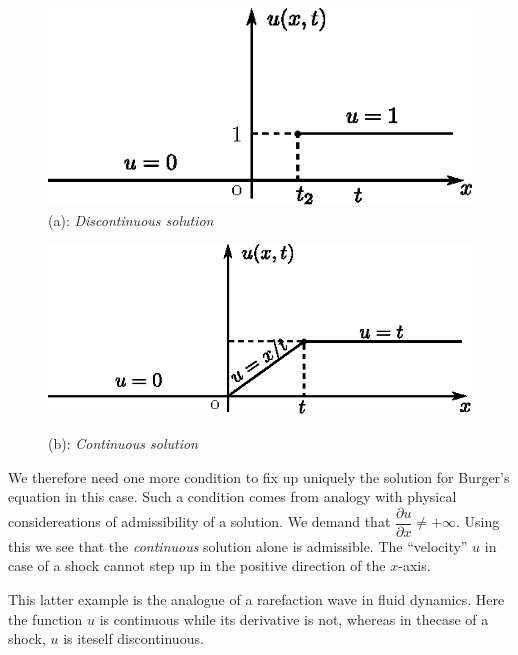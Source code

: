 \begin{exam}
\begin{figure}[H]
\centering
\includegraphics{figures/fig52-3.6a.eps}
\caption{(a): \textit{Discontinuous solution}}\label{c3:fig3.6}
\end{figure}
\pageoriginale 
\begin{figure}[H]
\centering
\includegraphics{figures/fig52-3.6b.eps}
\centerline{(b): \textit{Continuous solution}}
\end{figure}

We therefore need one more condition to fix up uniquely the solution
for Burger's equation in this case. Such a condition comes from
analogy with physical considereations of admissibility of a
solution. We demand that $\dfrac{\partial u}{\partial x} \neq +
\infty$. Using this we see that the {\em continuous} solution alone is
admissible. The ``velocity'' $u$ in case of a shock cannot step up in
the positive direction of the $x$-axis.

This latter example is the analogue of a rarefaction wave in fluid
dynamics. Here the function $u$ is continuous while its derivative is
not, whereas in the\pageoriginale case of a shock, $u$ is iteself
discontinuous. 
\end{exam}

